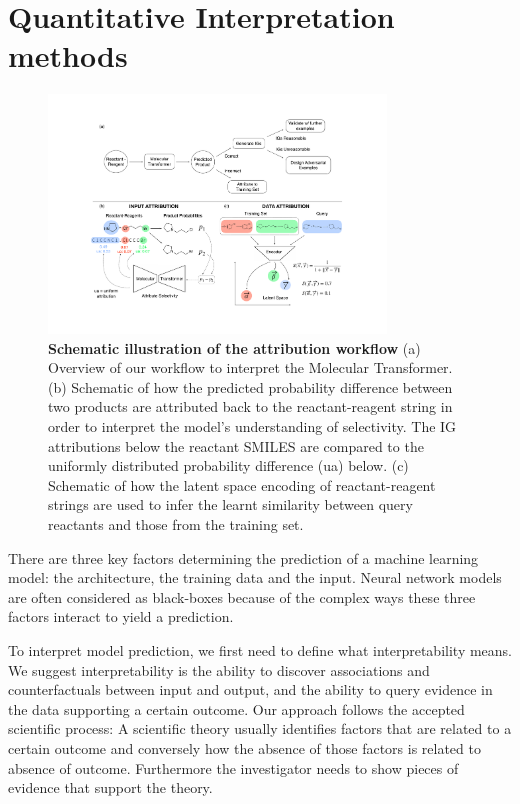 \section{Quantitative Interpretation methods}

\begin{figure}[ht!]
    \centering
    \includegraphics[width=0.8\textwidth]{Chapters/Transformer/Figs/workflow.pdf}
    \caption{\label{fig:workflow} \textbf{Schematic illustration of the attribution workflow} (a) Overview of our workflow to interpret the Molecular Transformer. (b) Schematic of how the predicted probability difference between two products are attributed back to the reactant-reagent string in order to interpret the model's understanding of selectivity. The IG attributions below the reactant SMILES are compared to the uniformly distributed probability difference (ua) below. (c) Schematic of how the latent space encoding of reactant-reagent strings are used to infer the learnt similarity between query reactants and those from the training set.}
\end{figure}

There are three key factors determining the prediction of a machine learning model: the architecture, the training data and the input. Neural network models are often considered as black-boxes because of the complex ways these three factors interact to yield a prediction. 

To interpret model prediction, we first need to define what interpretability means. We suggest interpretability is the ability to discover associations and counterfactuals between input and output, and the ability to query evidence in the data supporting a certain outcome. Our approach follows the accepted scientific process: A scientific theory usually identifies factors that are related to a certain outcome and conversely how the absence of those factors is related to absence of outcome. Furthermore the investigator needs to show pieces of evidence that support the theory.


